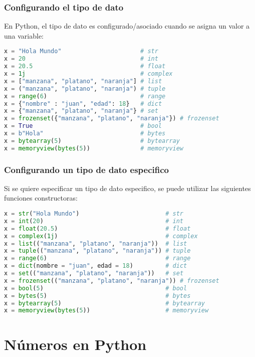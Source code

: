 \begin{frame}[fragile]
  \frametitle{Configurando el tipo de dato}

  En Python, el tipo de dato es configurado/asociado cuando se asigna un
  valor a una variable:

  \begin{lstlisting}[language=Python]
x = "Hola Mundo"                      # str
x = 20                                # int
x = 20.5                              # float
x = 1j                                # complex
x = ["manzana", "platano", "naranja"] # list
x = ("manzana", "platano", "naranja") # tuple
x = range(6)                          # range
x = {"nombre" : "juan", "edad": 18}   # dict
x = {"manzana", "platano", "naranja"} # set
x = frozenset({"manzana", "platano", "naranja"}) # frozenset
x = True                              # bool
x = b"Hola"                           # bytes
x = bytearray(5)                      # bytearray
x = memoryview(bytes(5))              # memoryview
  \end{lstlisting}
\end{frame}

\begin{frame}[fragile]
  \frametitle{Configurando un tipo de dato especifico}

  Si se quiere especificar un tipo de dato especifico, se puede utilizar
  las siguientes funciones constructoras:

  \begin{lstlisting}[language=Python]
x = str("Hola Mundo")                        # str
x = int(20)                                  # int
x = float(20.5)                              # float
x = complex(1j)                              # complex
x = list(("manzana", "platano", "naranja"))  # list
x = tuple(("manzana", "platano", "naranja")) # tuple
x = range(6)                                 # range
x = dict(nombre = "juan", edad = 18)         # dict
x = set(("manzana", "platano", "naranja"))   # set
x = frozenset(("manzana", "platano", "naranja")) # frozenset
x = bool(5)                                  # bool
x = bytes(5)                                 # bytes
x = bytearray(5)                             # bytearray
x = memoryview(bytes(5))                     # memoryview
  \end{lstlisting}
\end{frame}

\section{Números en Python}

